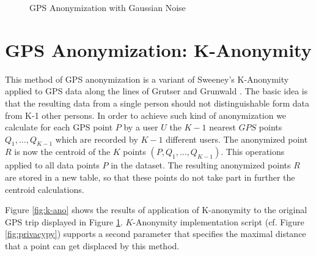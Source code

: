 \begin{figure}
  \centering
  \quad
  \caption{GPS Anonymization with Gaussian Noise}
  \label{fig:noise}
\end{figure}

\section{GPS Anonymization: K-Anonymity}
This method of GPS anonymization is a variant of Sweeney's K-Anonymity
\cite{sweeney2002k} applied to GPS data along the lines of Grutser and
Grunwald \cite{Gruteser2003}.  The basic idea is that the resulting
data from a single person should not distinguishable form data from
K-1 other persons. In order to achieve such kind of anonymization we
calculate for each GPS point $P$ by a user $U$ the $K-1$ nearest $GPS$
points $Q_1, \dots, Q_{K-1}$ which are recorded by $K-1$ different
users.  The anonymized point $R$ is now the centroid of the $K$ points
$(P,Q_1,\dots,Q_{K-1})$. This operations applied to all data points
$P$ in the dataset. The resulting anonymized points $R$ are stored in
a new table, so that these points do not take part in further the
centroid calculations.

Figure \ref{fig:k-ano} shows the results of application of K-anonymity
to the original GPS trip displayed in Figure \ref{fig:noise}.
$K$-Anonymity implementation script (cf. Figure \ref{fig:privacypy})
supports a second parameter that specifies the maximal distance that a
point can get displaced by this method.

